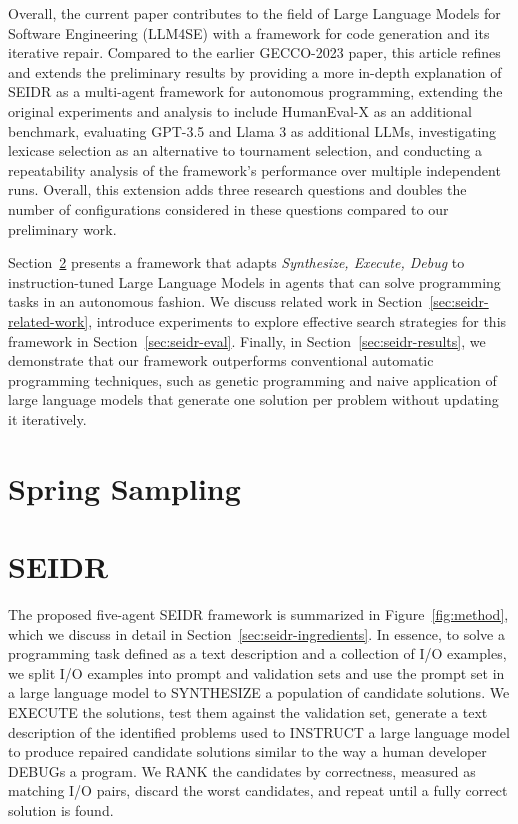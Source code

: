 Overall, the current paper contributes to the field of Large Language Models for Software Engineering (LLM4SE) with a framework for code generation and its iterative repair. 
Compared to the earlier GECCO-2023 paper, this article refines and extends the preliminary results by providing a more in-depth explanation of SEIDR as a multi-agent framework for autonomous programming, extending the original experiments and analysis to include HumanEval-X as an additional benchmark, evaluating GPT-3.5 and Llama 3 as additional LLMs, investigating lexicase selection as an alternative to tournament selection, and conducting a repeatability analysis of the framework’s performance over multiple independent runs. Overall, this extension adds three research questions and doubles the number of configurations considered in these questions compared to our preliminary work. 

Section~\ref{sec:seidr-methodology} presents a framework that adapts \emph{Synthesize, Execute, Debug} to instruction-tuned Large Language Models in agents that can solve programming tasks in an autonomous fashion. 
We discuss related work in Section~\ref{sec:seidr-related-work}, introduce experiments to explore effective search 
strategies for this framework in Section~\ref{sec:seidr-eval}. 
Finally, in Section~\ref{sec:seidr-results}, we demonstrate that our framework outperforms conventional automatic programming techniques, such as genetic programming and naive application of large language models that generate one solution per problem without updating it iteratively. 

\section{Spring Sampling}


\section{SEIDR}
\label{sec:seidr-methodology}
The proposed five-agent SEIDR framework is summarized in Figure~\ref{fig:method}, which we discuss in detail in Section~\ref{sec:seidr-ingredients}.
In essence, to solve a programming task defined as a text description and a collection of I/O examples, we split I/O examples into prompt and validation sets and use the prompt set in a large language model to SYNTHESIZE a population of candidate solutions.
We EXECUTE the solutions, test them against the validation set, generate a text description of the identified problems used to INSTRUCT a large language model to produce repaired candidate solutions similar to the way a human developer DEBUGs a program.
We RANK the candidates
by correctness, measured as matching I/O pairs, discard the worst candidates, and repeat until a fully correct solution is found.

